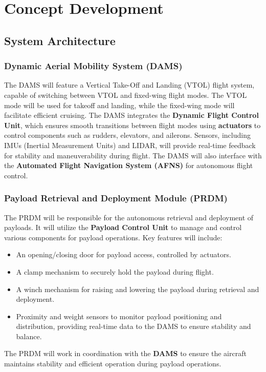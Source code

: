 \documentclass[12pt]{article}
\begin{document}
\newpage
\section{Concept Development}
\subsection{System Architecture}

\subsubsection{Dynamic Aerial Mobility System (DAMS)}
The DAMS will feature a Vertical Take-Off and Landing (VTOL) flight system, capable of switching between VTOL and fixed-wing flight modes. The VTOL mode will be used for takeoff and landing, while the fixed-wing mode will facilitate efficient cruising. The DAMS integrates the \textbf{Dynamic Flight Control Unit}, which ensures smooth transitions between flight modes using \textbf{actuators} to control components such as rudders, elevators, and ailerons. Sensors, including IMUs (Inertial Measurement Units) and LIDAR, will provide real-time feedback for stability and maneuverability during flight. The DAMS will also interface with the \textbf{Automated Flight Navigation System (AFNS)} for autonomous flight control.

\subsubsection{Payload Retrieval and Deployment Module (PRDM)}
The PRDM will be responsible for the autonomous retrieval and deployment of payloads. It will utilize the \textbf{Payload Control Unit} to manage and control various components for payload operations. Key features will include:
\begin{itemize}
    \item An opening/closing door for payload access, controlled by actuators.
    \item A clamp mechanism to securely hold the payload during flight.
    \item A winch mechanism for raising and lowering the payload during retrieval and deployment.
    \item Proximity and weight sensors to monitor payload positioning and distribution, providing real-time data to the DAMS to ensure stability and balance.
\end{itemize}
The PRDM will work in coordination with the \textbf{DAMS} to ensure the aircraft maintains stability and efficient operation during payload operations.
\end{document}
